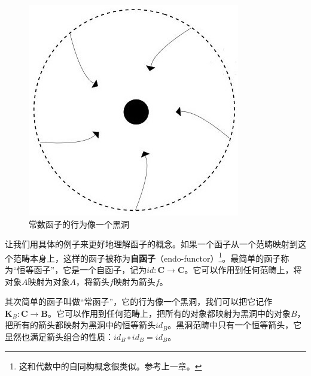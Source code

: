 \documentclass[b5paper]{ctexart}
\begin{document}
\begin{figure}[htbp]
 \centering
 \includegraphics[scale=0.3]{img/blackhole.jpg}
 \captionsetup{labelformat=empty}
 \caption{常数函子的行为像一个黑洞}
 \label{fig:blackhole}
\end{figure}

 
让我们用具体的例子来更好地理解函子的概念。如果一个函子从一个范畴映射到这个范畴本身上，这样的函子被称为\textbf{自函子}（endo-functor）\footnote{这和代数中的自同构概念很类似。参考上一章。}。最简单的函子称为“恒等函子”，它是一个自函子，记为$id: \pmb{C} \to \pmb{C}$。它可以作用到任何范畴上，将对象$A$映射为对象$A$，将箭头$f$映射为箭头$f$。

其次简单的函子叫做“常函子”，它的行为像一个黑洞，我们可以把它记作$\mathbf{K}_B : \pmb{C} \to \pmb{B}$。它可以作用到任何范畴上，把所有的对象都映射为黑洞中的对象$B$，把所有的箭头都映射为黑洞中的恒等箭头$id_B$。黑洞范畴中只有一个恒等箭头，它显然也满足箭头组合的性质：$id_B \circ id_B = id_B$。
\end{document}
